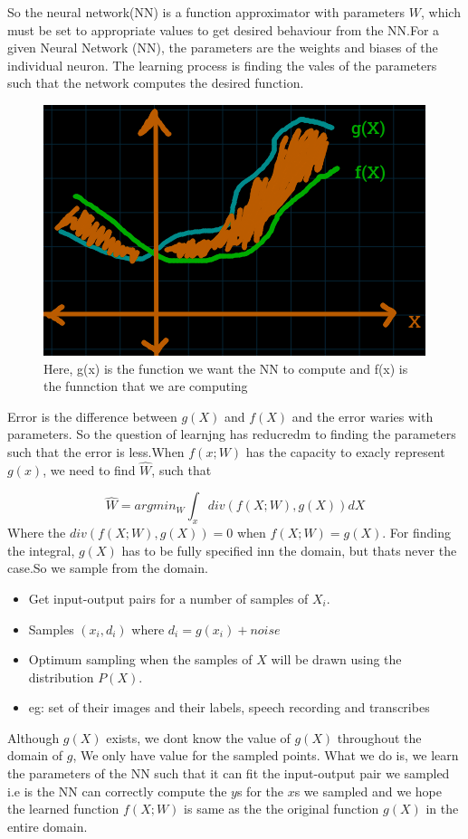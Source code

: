 \documentclass[12pt]{article}
\begin{document}
So the neural network(NN) is a function approximator with parameters $W$, which must be set to appropriate values to get desired behaviour from the NN.For a given Neural Network (NN), the parameters are the weights and biases of the individual neuron. The learning process is finding the vales of the parameters such that the network computes the desired function.


\begin{figure}[ht]
	\centering
	\includegraphics[width=0.5\linewidth]{img/error}
	\caption{Here, g(x) is the function we want the NN to  compute and f(x) is the funnction that we are computing}
	\label{fig:error}
\end{figure}

Error is the difference between $g(X)$ and $f(X)$ and the error waries with parameters. So the question of learnjng has reducredm to finding the parameters such that the error is less.When $f(x;W)$ has the capacity to exacly represent $g(x)$, we need to find $\hat{W}$, such that

$$ \hat{W} = argmin_W \int _x div(f(X;W), g(X)) dX$$
Where the $div(f(X;W), g(X)) = 0$ when $f(X;W) =  g(X)$. For finding the integral, $g(X)$ has to be fully specified inn the domain, but thats never the case.So we sample from the domain.

\begin{itemize}
	\item Get input-output pairs for a number of samples of $X_i$.
	\item Samples $(x_i, d_i)$ where $d_i = g(x_i) + noise $
	\item Optimum sampling when the samples of $X$ will be drawn using the distribution $P(X)$.
	\item eg: set of their images and their labels, speech recording and transcribes
\end{itemize}

Although $g(X)$ exists, we dont know the value of $g(X)$ throughout the domain of $g$, We only have value for the sampled points. What we do is, we learn the parameters of the NN such that it can fit the input-output pair we sampled i.e is the NN can correctly compute the $y$s for the $x$s we sampled and we hope the learned function $f(X;W)$ is same as the the original function $g(X)$ in the entire domain.
\end{document}
